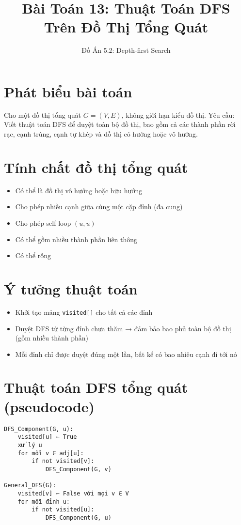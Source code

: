 \documentclass[12pt]{article}
\title{Bài Toán 13: Thuật Toán DFS Trên Đồ Thị Tổng Quát}
\author{Đồ Án 5.2: Depth-first Search}
\date{}
\begin{document}
\maketitle

\section*{Phát biểu bài toán}
Cho một đồ thị tổng quát $G = (V, E)$, không giới hạn kiểu đồ thị.  
Yêu cầu: Viết thuật toán DFS để duyệt toàn bộ đồ thị, bao gồm cả các thành phần rời rạc, cạnh trùng, cạnh tự khép và đồ thị có hướng hoặc vô hướng.

\section*{Tính chất đồ thị tổng quát}
\begin{itemize}
    \item Có thể là đồ thị vô hướng hoặc hữu hướng
    \item Cho phép nhiều cạnh giữa cùng một cặp đỉnh (đa cung)
    \item Cho phép self-loop $(u, u)$
    \item Có thể gồm nhiều thành phần liên thông
    \item Có thể rỗng
\end{itemize}

\section*{Ý tưởng thuật toán}
\begin{itemize}
    \item Khởi tạo mảng \texttt{visited[]} cho tất cả các đỉnh
    \item Duyệt DFS từ từng đỉnh chưa thăm → đảm bảo bao phủ toàn bộ đồ thị (gồm nhiều thành phần)
    \item Mỗi đỉnh chỉ được duyệt đúng một lần, bất kể có bao nhiêu cạnh đi tới nó
\end{itemize}

\section*{Thuật toán DFS tổng quát (pseudocode)}
\begin{verbatim}
DFS_Component(G, u):
    visited[u] ← True
    xử lý u
    for mỗi v ∈ adj[u]:
        if not visited[v]:
            DFS_Component(G, v)

General_DFS(G):
    visited[v] ← False với mọi v ∈ V
    for mỗi đỉnh u:
        if not visited[u]:
            DFS_Component(G, u)
\end{verbatim}
\end{document}
